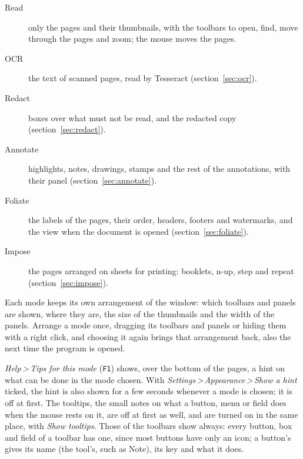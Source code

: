 \documentclass[12pt,
              article,
              oneside
              ]{memoir}
\newcommand*{\menu}[1]{\textit{#1}}
\newcommand*{\then}{\,>\,}
\newcommand*{\key}[1]{\texttt{#1}}
\begin{document}
%
\begin{description}
\item[Read] only the pages and their thumbnails, with the toolbars to
  open, find, move through the pages and zoom; the mouse moves the pages.
\item[OCR] the text of scanned pages, read by Tesseract
  (section~\ref{sec:ocr}).
\item[Redact] boxes over what must not be read, and the redacted copy
  (section~\ref{sec:redact}).
\item[Annotate] highlights, notes, drawings, stamps and the rest of the
  annotations, with their panel (section~\ref{sec:annotate}).
\item[Foliate] the labels of the pages, their order, headers, footers and
  watermarks, and the view when the document is opened
  (section~\ref{sec:foliate}).
\item[Impose] the pages arranged on sheets for printing: booklets, n-up,
  step and repeat (section~\ref{sec:impose}).
\end{description}

%
Each mode keeps its own arrangement of the window: which toolbars and
panels are shown, where they are, the size of the thumbnails and the width
of the panels. Arrange a mode once, dragging its toolbars and panels or
hiding them with a right click, and choosing it again brings that
arrangement back, also the next time the program is opened.

%
\menu{Help\then Tips for this mode} (\key{F1}) shows, over the bottom of
the pages, a hint on what can be done in the mode chosen. With
\menu{Settings\then Appearance\then Show a hint} ticked, the hint is also
shown for a few seconds whenever a mode is chosen; it is off at first. The
tooltips, the small notes on what a button, menu or field does when the
mouse rests on it, are off at first as well, and are turned on in the same
place, with \menu{Show tooltips}. Those of the toolbars show always: every
button, box and field of a toolbar has one, since most buttons have only an
icon; a button's gives its name (the tool's, such as Note), its key and
what it does.
\end{document}
